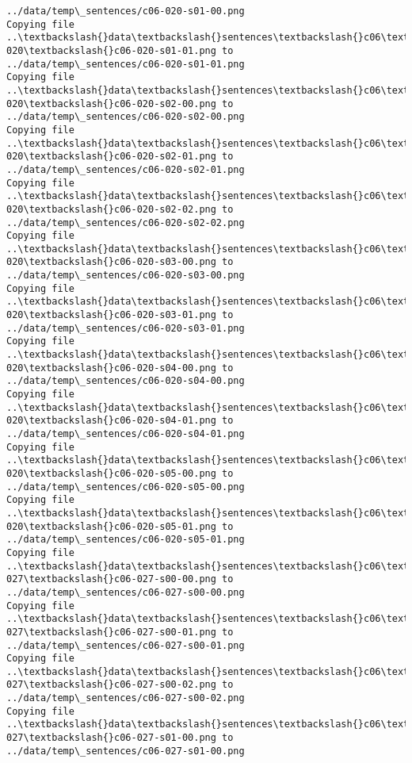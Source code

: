 \documentclass[11pt]{article}
\begin{document}
\begin{Verbatim}[commandchars=\\\{\}]
../data/temp\_sentences/c06-020-s01-00.png
Copying file ..\textbackslash{}data\textbackslash{}sentences\textbackslash{}c06\textbackslash{}c06-020\textbackslash{}c06-020-s01-01.png to
../data/temp\_sentences/c06-020-s01-01.png
Copying file ..\textbackslash{}data\textbackslash{}sentences\textbackslash{}c06\textbackslash{}c06-020\textbackslash{}c06-020-s02-00.png to
../data/temp\_sentences/c06-020-s02-00.png
Copying file ..\textbackslash{}data\textbackslash{}sentences\textbackslash{}c06\textbackslash{}c06-020\textbackslash{}c06-020-s02-01.png to
../data/temp\_sentences/c06-020-s02-01.png
Copying file ..\textbackslash{}data\textbackslash{}sentences\textbackslash{}c06\textbackslash{}c06-020\textbackslash{}c06-020-s02-02.png to
../data/temp\_sentences/c06-020-s02-02.png
Copying file ..\textbackslash{}data\textbackslash{}sentences\textbackslash{}c06\textbackslash{}c06-020\textbackslash{}c06-020-s03-00.png to
../data/temp\_sentences/c06-020-s03-00.png
Copying file ..\textbackslash{}data\textbackslash{}sentences\textbackslash{}c06\textbackslash{}c06-020\textbackslash{}c06-020-s03-01.png to
../data/temp\_sentences/c06-020-s03-01.png
Copying file ..\textbackslash{}data\textbackslash{}sentences\textbackslash{}c06\textbackslash{}c06-020\textbackslash{}c06-020-s04-00.png to
../data/temp\_sentences/c06-020-s04-00.png
Copying file ..\textbackslash{}data\textbackslash{}sentences\textbackslash{}c06\textbackslash{}c06-020\textbackslash{}c06-020-s04-01.png to
../data/temp\_sentences/c06-020-s04-01.png
Copying file ..\textbackslash{}data\textbackslash{}sentences\textbackslash{}c06\textbackslash{}c06-020\textbackslash{}c06-020-s05-00.png to
../data/temp\_sentences/c06-020-s05-00.png
Copying file ..\textbackslash{}data\textbackslash{}sentences\textbackslash{}c06\textbackslash{}c06-020\textbackslash{}c06-020-s05-01.png to
../data/temp\_sentences/c06-020-s05-01.png
Copying file ..\textbackslash{}data\textbackslash{}sentences\textbackslash{}c06\textbackslash{}c06-027\textbackslash{}c06-027-s00-00.png to
../data/temp\_sentences/c06-027-s00-00.png
Copying file ..\textbackslash{}data\textbackslash{}sentences\textbackslash{}c06\textbackslash{}c06-027\textbackslash{}c06-027-s00-01.png to
../data/temp\_sentences/c06-027-s00-01.png
Copying file ..\textbackslash{}data\textbackslash{}sentences\textbackslash{}c06\textbackslash{}c06-027\textbackslash{}c06-027-s00-02.png to
../data/temp\_sentences/c06-027-s00-02.png
Copying file ..\textbackslash{}data\textbackslash{}sentences\textbackslash{}c06\textbackslash{}c06-027\textbackslash{}c06-027-s01-00.png to
../data/temp\_sentences/c06-027-s01-00.png

\end{Verbatim}
\end{document}
